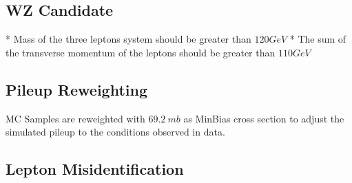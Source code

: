 \subsection{WZ Candidate}

* Mass of the three leptons system should be greater than $120GeV$
* The sum of the transverse momentum of the leptons should be greater than $110GeV$

\subsection{Pileup Reweighting}

MC Samples are reweighted with $69.2~mb$ as MinBias cross section to adjust the
simulated pileup to the conditions observed in data.

\subsection{Lepton Misidentification}



















